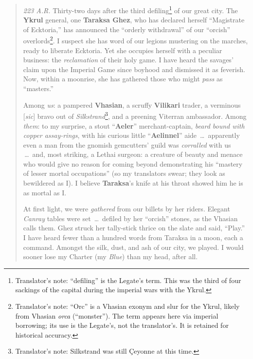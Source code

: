 \documentclass[11pt]{article}
\begin{document}
\begin{quote}\small
\textit{223 A.R.} Thirty-two days after the third defiling\footnote{Translator’s note: “defiling” is the Legate’s term. This was the third of four sackings of the capital during the imperial wars with the Ykrul.} of our great city. The \textbf{Ykrul} general, one \textbf{Taraksa Ghez}, who has declared herself ``Magistrate of Ecktoria,'' has announced the ``orderly withdrawal'' of our ``orcish'' overlords\footnote{Translator’s note: ``Orc'' is a Vhasian exonym and slur for the Ykrul, likely from Vhasian \emph{orca} (``monster''). The term appears here via imperial borrowing; its use is the Legate’s, not the translator’s. It is retained for historical accuracy.}. I suspect she has word of our legions mustering on the marches, ready to liberate Ecktoria. Yet she occupies herself with a peculiar business: the \emph{reclamation} of their holy game. I have heard the savages’ claim upon the Imperial Game since boyhood and dismissed it as feverish. Now, within a moonrise, she has gathered those who might \emph{pass} as ``masters.''

Among \emph{us}: a pampered \textbf{Vhasian}, a scruffy \textbf{Vilikari} trader, a verminous [\emph{sic}] bravo out of \emph{Silkstrand}\footnote{Translator’s note: Silkstrand was still \c{C}eyonne at this time.}, and a preening Viterran ambassador. Among \emph{them}: to my surprise, a stout ``\textbf{Aeler}'' merchant-captain, \emph{beard bound with copper assay-rings}, with his curious little ``\textbf{Aelinnel}'' aide \,\dots\ apparently even a man from the gnomish gemcutters' guild was \emph{corralled} with us \,\dots\ and, most striking, a Lethai surgeon: a creature of beauty and menace who would give no reason for coming beyond demonstrating his ``mastery of lesser mortal occupations'' (so my translators swear; they look as bewildered as I). I believe \textbf{Taraksa}’s knife at his throat showed him he is as mortal as I.

At first light, we were \emph{gathered} from our billets by her riders. Elegant \emph{Canray} tables were set \,\dots\ defiled by her ``orcish'' stones, as the Vhasian calls them. Ghez struck her tally-stick thrice on the slate and said, ``Play.'' I have heard fewer than a hundred words from Taraksa in a moon, each a command. Amongst the silk, dust, and ash of our city, we played. I would sooner lose my Charter (my \emph{Blue}) than my head, after all.
\end{quote}
\end{document}
